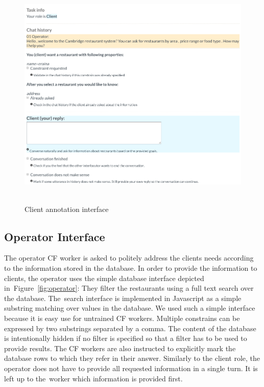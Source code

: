 \documentclass[runningheads,a4paper]{llncs}
\begin{document}
\begin{figure}[tb] %
\vspace{-1.00em}
\begin{center}
\includegraphics[height=30em]{gui-annotators-client}
\caption{Client annotation interface}
\end{center}
\vspace{-1.00em}
\label{fig:client}
\end{figure}
\vspace{-1.00em}

\vspace{-1.00em}
\subsection{Operator Interface}
\label{sec:operator}
The operator CF worker is asked to politely address the clients needs according to the information stored in the database.
In order to provide the information to clients, the operator uses the simple database interface depicted in~Figure~\ref{fig:operator}:
They filter the restaurants using a full text search over the database.
The~search interface is implemented in Javascript as a simple substring matching over values in the database.
We used such a simple interface because it is easy use for untrained CF workers.
Multiple constrains can be expressed by two substrings separated by a comma.
The content of the database is intentionally hidden if no filter is specified so that a filter has to be used to provide results.
The CF workers are also instructed to explicitly mark the database rows to which they refer in their answer.
Similarly to the client role, the operator does not have to provide all requested information in a single turn.
It is left up to the~worker which information is provided first.
\end{document}
